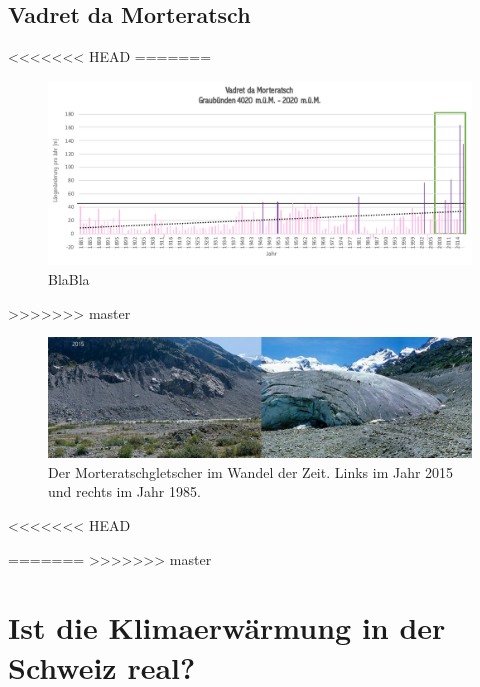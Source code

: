 \begin{refsection}
\subsection{Vadret da Morteratsch}

<<<<<<< HEAD
=======
\begin{figure}[htbp]
\centering
\includegraphics[width=1.0\textwidth]{extrem/Morteratsch.pdf}
\caption{BlaBla}
\label{Morteratschtab}
\end{figure}
>>>>>>> master

\begin{figure}[htbp]
\centering
\includegraphics[width=1.0\textwidth]{extrem/Morteratsch.jpg}
\caption{Der Morteratschgletscher im Wandel der Zeit. Links im Jahr 2015 und rechts im Jahr 1985.}
\label{Morteratsch}
\end{figure}


<<<<<<< HEAD



=======
>>>>>>> master
\section{Ist die Klimaerwärmung in der Schweiz real?}








\printbibliography[heading=subbibliography]
\end{refsection}
